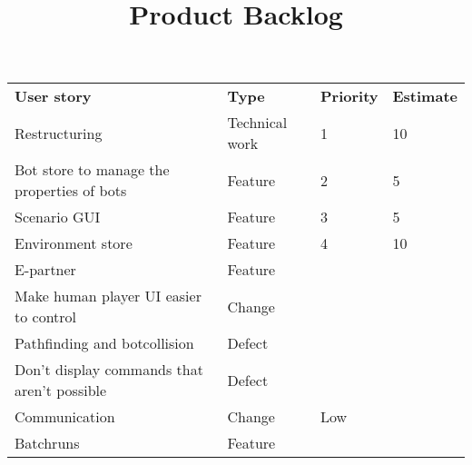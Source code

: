\documentclass{article}
\begin{document}
\title{Product Backlog}
\date{}
\maketitle

\begin{tabular}{l l l l}
\textbf{User story} & \textbf{Type} & \textbf{Priority} & \textbf{Estimate}\\
Restructuring & Technical work & 1 & 10\\ 
Bot store to manage the properties of bots & Feature & 2 & 5\\
Scenario GUI & Feature & 3 & 5\\
Environment store & Feature & 4 & 10\\
E-partner & Feature & &\\
Make human player UI easier to control & Change & &\\
Pathfinding and botcollision & Defect & & \\
Don't display commands that aren't possible & Defect & &\\
Communication & Change & Low &\\
Batchruns & Feature & &\\
\end{tabular}
\end{document}
